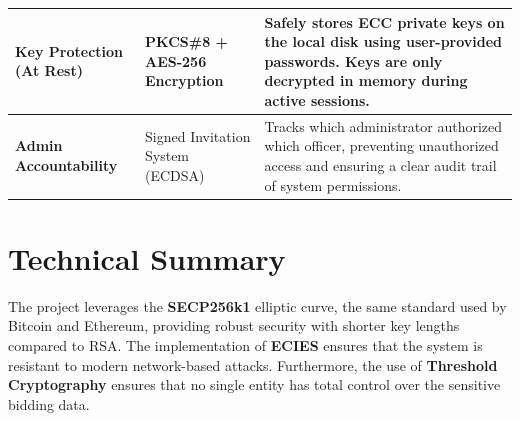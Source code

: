 \documentclass[12pt,a4paper]{article}
\begin{document}
\begin{longtable}{>{\raggedright\arraybackslash}p{} >{\raggedright\arraybackslash}p{} >{\raggedright\arraybackslash}p{}}
\textbf{Key Protection (At Rest)} & PKCS\#8 + AES-256 Encryption & Safely stores ECC private keys on the local disk using user-provided passwords. Keys are only decrypted in memory during active sessions. \\ \midrule

\textbf{Admin Accountability} & Signed Invitation System (ECDSA) & Tracks which administrator authorized which officer, preventing unauthorized access and ensuring a clear audit trail of system permissions. \\ \bottomrule
\end{longtable}

\section{Technical Summary}
The project leverages the \textbf{SECP256k1} elliptic curve, the same standard used by Bitcoin and Ethereum, providing robust security with shorter key lengths compared to RSA. The implementation of \textbf{ECIES} ensures that the system is resistant to modern network-based attacks. Furthermore, the use of \textbf{Threshold Cryptography} ensures that no single entity has total control over the sensitive bidding data.
\end{document}
